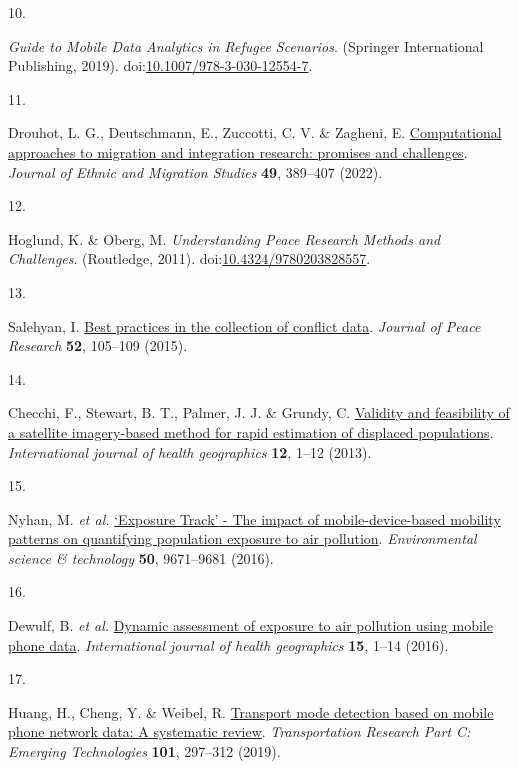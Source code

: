 \documentclass[
  11pt,
]{article}
\newlength{\cslhangindent}
\newlength{\csllabelwidth}
\newenvironment{CSLReferences}[2] %
 {\begin{list}{}{%
  \setlength{\itemindent}{0pt}
  \setlength{\leftmargin}{0pt}
  \setlength{\parsep}{0pt}
  \ifodd #1
   \setlength{\leftmargin}{\cslhangindent}
   \setlength{\itemindent}{-1\cslhangindent}
  \fi
  \setlength{\itemsep}{#2\baselineskip}}}
 {\end{list}}
\newcommand{\CSLLeftMargin}[1]{\parbox[t]{\csllabelwidth}{\strut#1\strut}}
\newcommand{\CSLRightInline}[1]{\parbox[t]{\linewidth - \csllabelwidth}{\strut#1\strut}}
\begin{document}
\begin{CSLReferences}{0}{0}
\CSLLeftMargin{10. }%
\CSLRightInline{\emph{Guide to Mobile Data Analytics in Refugee
Scenarios}. (Springer International Publishing, 2019).
doi:\href{https://doi.org/10.1007/978-3-030-12554-7}{10.1007/978-3-030-12554-7}.}

\CSLLeftMargin{11. }%
\CSLRightInline{Drouhot, L. G., Deutschmann, E., Zuccotti, C. V. \&
Zagheni, E.
\href{https://doi.org/10.1080/1369183x.2022.2100542}{Computational
approaches to migration and integration research: promises and
challenges}. \emph{Journal of Ethnic and Migration Studies} \textbf{49},
389--407 (2022).}

\CSLLeftMargin{12. }%
\CSLRightInline{Hoglund, K. \& Oberg, M. \emph{Understanding Peace
Research Methods and Challenges}. (Routledge, 2011).
doi:\href{https://doi.org/10.4324/9780203828557}{10.4324/9780203828557}.}

\CSLLeftMargin{13. }%
\CSLRightInline{Salehyan, I.
\href{https://doi.org/10.1177/0022343314551563}{Best practices in the
collection of conflict data}. \emph{Journal of Peace Research}
\textbf{52}, 105--109 (2015).}

\CSLLeftMargin{14. }%
\CSLRightInline{Checchi, F., Stewart, B. T., Palmer, J. J. \& Grundy, C.
\href{https://doi.org/10.1186/1476-072X-12-4}{Validity and feasibility
of a satellite imagery-based method for rapid estimation of displaced
populations}. \emph{International journal of health geographics}
\textbf{12}, 1--12 (2013).}

\CSLLeftMargin{15. }%
\CSLRightInline{Nyhan, M. \emph{et al.}
\href{https://doi.org/10.1021/acs.est.6b02385}{{{`Exposure Track'} -
The} impact of mobile-device-based mobility patterns on quantifying
population exposure to air pollution}. \emph{Environmental science \&
technology} \textbf{50}, 9671--9681 (2016).}

\CSLLeftMargin{16. }%
\CSLRightInline{Dewulf, B. \emph{et al.}
\href{https://doi.org/10.1186/s12942-016-0042-z}{Dynamic assessment of
exposure to air pollution using mobile phone data}. \emph{International
journal of health geographics} \textbf{15}, 1--14 (2016).}

\CSLLeftMargin{17. }%
\CSLRightInline{Huang, H., Cheng, Y. \& Weibel, R.
\href{https://doi.org/10.1016/j.trc.2019.02.008}{Transport mode
detection based on mobile phone network data: {A} systematic review}.
\emph{Transportation Research Part C: Emerging Technologies}
\textbf{101}, 297--312 (2019).}


\end{CSLReferences}
\end{document}
